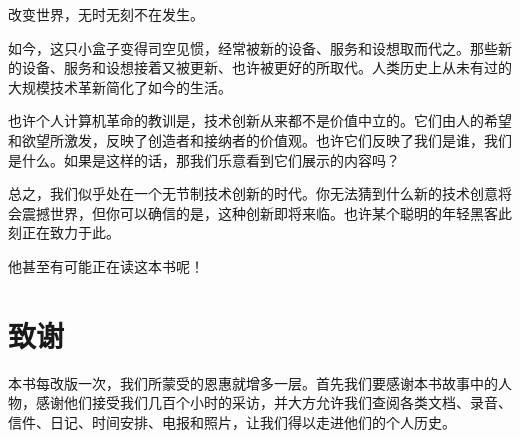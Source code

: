 \documentclass[12pt,UTF8]{ctexbook}
\begin{document}
改变世界，无时无刻不在发生。

如今，这只小盒子变得司空见惯，经常被新的设备、服务和设想取而代之。那些新的设备、服务和设想接着又被更新、也许被更好的所取代。人类历史上从未有过的大规模技术革新简化了如今的生活。

也许个人计算机革命的教训是，技术创新从来都不是价值中立的。它们由人的希望和欲望所激发，反映了创造者和接纳者的价值观。也许它们反映了我们是谁，我们是什么。如果是这样的话，那我们乐意看到它们展示的内容吗？

总之，我们似乎处在一个无节制技术创新的时代。你无法猜到什么新的技术创意将会震撼世界，但你可以确信的是，这种创新即将来临。也许某个聪明的年轻黑客此刻正在致力于此。

他甚至有可能正在读这本书呢！



\backmatter

\chapter{致谢}


本书每改版一次，我们所蒙受的恩惠就增多一层。首先我们要感谢本书故事中的人物，感谢他们接受我们几百个小时的采访，并大方允许我们查阅各类文档、录音、信件、日记、时间安排、电报和照片，让我们得以走进他们的个人历史。
\end{document}
